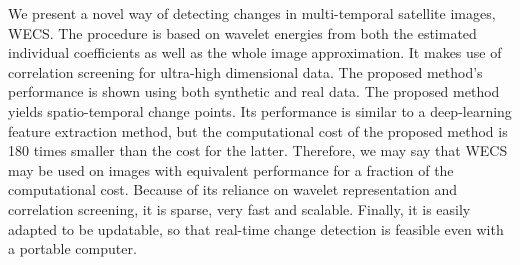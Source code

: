 \documentclass[journal]{IEEEtran}
\begin{document}
We present a novel way of detecting changes in multi-temporal satellite images, WECS. The procedure is based on wavelet energies from both the estimated individual coefficients as well as the whole image approximation. It makes use of correlation screening for ultra-high dimensional data. The proposed method's performance is shown using both synthetic and real data. The proposed method yields spatio-temporal  change points. Its performance is similar to a deep-learning feature extraction method, but the computational cost of the proposed method is 180 times smaller than the cost for the latter. Therefore, we may say that WECS may be used on images with equivalent performance for a fraction of the computational cost. Because of its reliance on wavelet representation and correlation screening, it is sparse, very fast and scalable. Finally, it is easily adapted to be updatable, so that real-time change detection is feasible even with a portable computer.





%

%
\end{document}
